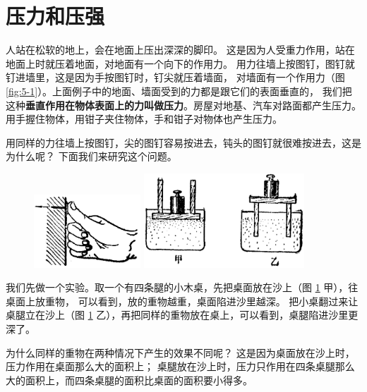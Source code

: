 \section{压力和压强}\label{sec:5-1}

人站在松软的地上，会在地面上压出深深的脚印。
这是因为人受重力作用，站在地面上时就压着地面，对地面有一个向下的作用力。
用力往墙上按图钉，图钉就钉进墙里，这是因为手按图钉时，钉尖就压着墙面，
对墙面有一个作用力（图 \ref{fig:5-1}）。上面例子中的地面、墙面受到的力都是跟它们的表面垂直的，
我们把这种\textbf{垂直作用在物体表面上的力叫做压力}。房屋对地基、汽车对路面都产生压力。
用手握住物体，用钳子夹住物体，手和钳子对物体也产生压力。

用同样的力往墙上按图钉，尖的图钉容易按进去，钝头的图钉就很难按进去，这是为什么呢？
下面我们来研究这个问题。

\begin{figure}[htbp]
    \centering
    \begin{minipage}{6cm}
    \centering
    \includegraphics[width=4cm]{../pic/czwl1-ch5-1}
    \caption{}\label{fig:5-1}
    \end{minipage}
    \qquad
    \begin{minipage}{8cm}
    \centering
    \includegraphics[width=6cm]{../pic/czwl1-ch5-2}
    \caption{}\label{fig:5-2}
    \end{minipage}
\end{figure}


我们先做一个实验。取一个有四条腿的小木桌，先把桌面放在沙上（图 \ref{fig:5-2} 甲），往桌面上放重物，
可以看到，放的重物越重，桌面陷进沙里越深。
把小桌翻过来让桌腿立在沙上（图 \ref{fig:5-2} 乙），再把同样的重物放在桌上，可以看到，桌腿陷进沙里更深了。

为什么同样的重物在两种情况下产生的效果不同呢？
这是因为桌面放在沙上时，压力作用在桌面那么大的面积上；
桌腿放在沙上时，压力只作用在四条桌腿那么大的面积上，而四条桌腿的面积比桌面的面积要小得多。

